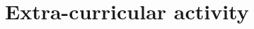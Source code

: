 \documentclass[11pt,a4paper,sans]{moderncv}        %
\begin{document}









\section{Extra-curricular activity}

\vspace{6pt}
\end{document}
